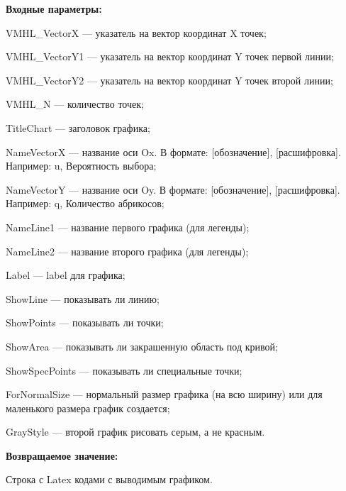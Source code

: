 \textbf{Входные параметры:}
 
VMHL\_VectorX --- указатель на вектор координат X точек;
 
VMHL\_VectorY1 --- указатель на вектор координат Y точек первой линии;
 
VMHL\_VectorY2 --- указатель на вектор координат Y точек второй линии;
 
VMHL\_N --- количество точек;
 
TitleChart --- заголовок графика;
 
NameVectorX --- название оси Ox. В формате: [обозначение], [расшифровка]. Например: u, Вероятность выбора;
 
NameVectorY --- название оси Oy. В формате: [обозначение], [расшифровка]. Например: q, Количество абрикосов;
 
NameLine1 --- название первого графика (для легенды);
 
NameLine2 --- название второго графика (для легенды);
 
Label --- label для графика;
 
ShowLine --- показывать ли линию;
 
ShowPoints --- показывать ли точки;
 
ShowArea --- показывать ли закрашенную область под кривой;
 
ShowSpecPoints --- показывать ли специальные точки;
 
ForNormalSize --- нормальный размер графика (на всю ширину) или для маленького размера график создается;
 
GrayStyle --- второй график рисовать серым, а не красным.
	
\textbf{Возвращаемое значение:}

Строка с Latex кодами с выводимым графиком.